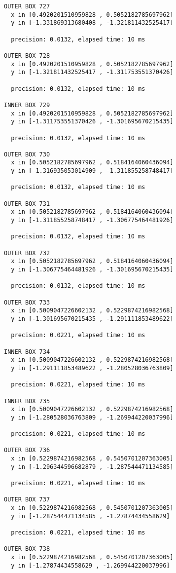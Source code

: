 \begin{verbatim}
OUTER BOX 727
  x in [0.4920201510959828 , 0.5052182785697962]
  y in [-1.331869313680408 , -1.321811432525417]

  precision: 0.0132, elapsed time: 10 ms

OUTER BOX 728
  x in [0.4920201510959828 , 0.5052182785697962]
  y in [-1.321811432525417 , -1.311753551370426]

  precision: 0.0132, elapsed time: 10 ms

INNER BOX 729
  x in [0.4920201510959828 , 0.5052182785697962]
  y in [-1.311753551370426 , -1.301695670215435]

  precision: 0.0132, elapsed time: 10 ms

OUTER BOX 730
  x in [0.5052182785697962 , 0.5184164060436094]
  y in [-1.316935053014909 , -1.311855258748417]

  precision: 0.0132, elapsed time: 10 ms

OUTER BOX 731
  x in [0.5052182785697962 , 0.5184164060436094]
  y in [-1.311855258748417 , -1.306775464481926]

  precision: 0.0132, elapsed time: 10 ms

OUTER BOX 732
  x in [0.5052182785697962 , 0.5184164060436094]
  y in [-1.306775464481926 , -1.301695670215435]

  precision: 0.0132, elapsed time: 10 ms

OUTER BOX 733
  x in [0.5009047226602132 , 0.5229874216982568]
  y in [-1.301695670215435 , -1.291111853489622]

  precision: 0.0221, elapsed time: 10 ms

INNER BOX 734
  x in [0.5009047226602132 , 0.5229874216982568]
  y in [-1.291111853489622 , -1.280528036763809]

  precision: 0.0221, elapsed time: 10 ms

INNER BOX 735
  x in [0.5009047226602132 , 0.5229874216982568]
  y in [-1.280528036763809 , -1.269944220037996]

  precision: 0.0221, elapsed time: 10 ms

OUTER BOX 736
  x in [0.5229874216982568 , 0.5450701207363005]
  y in [-1.296344596682879 , -1.287544471134585]

  precision: 0.0221, elapsed time: 10 ms

OUTER BOX 737
  x in [0.5229874216982568 , 0.5450701207363005]
  y in [-1.287544471134585 , -1.27874434558629]

  precision: 0.0221, elapsed time: 10 ms

OUTER BOX 738
  x in [0.5229874216982568 , 0.5450701207363005]
  y in [-1.27874434558629 , -1.269944220037996]


\end{verbatim}

